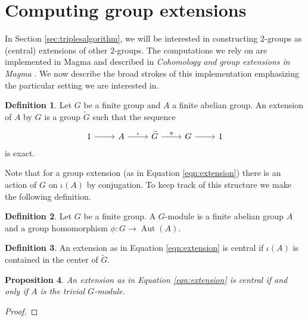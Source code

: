 \documentclass{dcthesis}
\newcommand{\defi}[1]{\textsf{#1}}
\newcommand{\wt}[1]{\widetilde{#1}}
\DeclareMathOperator{\Aut}{Aut}
\newtheorem{prop}{Proposition}[section]
\theoremstyle{definition}
\newtheorem{definition}[prop]{Definition}
\theoremstyle{remark}
\numberwithin{equation}{section}
\numberwithin{figure}{section}
\begin{document}
{  \section{Computing group extensions}{\label{sec:modcoho}
    In Section \ref{sec:triplesalgorithm},
    we will be interested in constructing $2$-groups
    as (central) extensions of other $2$-groups.
    The computations we rely on are implemented in
    \textsf{Magma}
    and described in
    \emph{Cohomology and group extensions in \textsf{Magma}}
    \cite{magmabook}.
    We now describe the broad strokes of this implementation
    emphasizing the particular setting we are interested in.
    \begin{definition}
      \label{def:groupextension}
      Let $G$ be a finite group
      and $A$ a finite abelian group.
      An \defi{extension of $A$ by $G$} is
      a group $\wt{G}$ such that the sequence
      \begin{equation}
        \label{eqn:extension}
        \begin{tikzcd}
          1\arrow{r}&A\arrow{r}{\iota}&\wt{G}\arrow{r}{\pi}&G\arrow{r}&1
        \end{tikzcd}
      \end{equation}
      is exact.
    \end{definition}
    Note that for a group extension
    (as in Equation \ref{eqn:extension})
    there is an action of $G$ on
    $\iota(A)$ by conjugation.
    To keep track of this structure we make the
    following definition.
    \begin{definition}
      \label{def:Gmodule}
      Let $G$ be a finite group.
      A \defi{$G$-module}
      is a finite abelian group $A$
      and a group homomorphism
      $\phi\colon G\to\Aut(A)$.
    \end{definition}
    \begin{definition}
      \label{def:centralextension}
      An extension as in Equation \ref{eqn:extension}
      is \defi{central}
      if $\iota(A)$ is contained in the center of $\wt{G}$.
    \end{definition}
    \begin{prop}
      \label{prop:centralextensionstrivialGaction}
      An extension as in Equation \ref{eqn:extension}
      is central
      if and only if $A$ is the trivial $G$-module.
    \end{prop}
    \begin{proof}

\end{proof}}}
\end{document}
